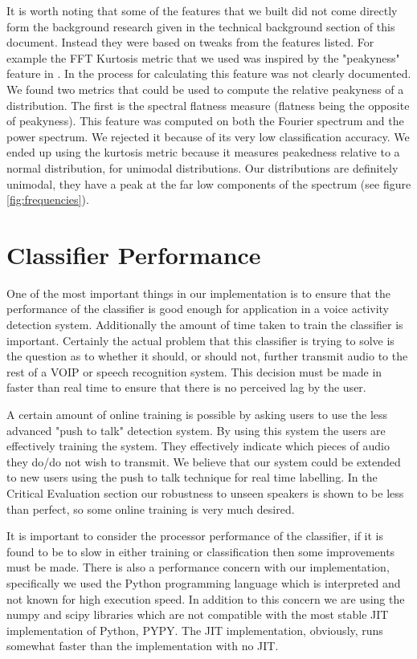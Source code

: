\documentclass[ %
                    author={Sam Phippen},
                supervisor={Dr. Rafal Bogacz},
                     title={Real time voice activity detectors in noisy personal computing environments},
                  subtitle={},
                    degree={MEng},
                      year={2012} ]{thesis}
\begin{document}
It is worth noting that some of the features that we built did not come
directly form the background research given in the technical background section
of this document. Instead they were based on tweaks from the features listed.
For example the FFT Kurtosis metric that we used was inspired by the
"peakyness" feature in \cite{shin}. In \cite{shin} the process for calculating
this feature was not clearly documented. We found two metrics that could be
used to compute the relative peakyness of a distribution. The first is the
spectral flatness measure (flatness being the opposite of peakyness). This
feature was computed on both the Fourier spectrum and the power spectrum. We
rejected it because of its very low classification accuracy. We ended up using
the kurtosis metric because it measures peakedness relative to a normal
distribution, for unimodal distributions\cite{DeCarlo}. Our distributions are
definitely unimodal, they have a peak at the far low components of the spectrum
(see figure \ref{fig:frequencies}).


\section{Classifier Performance}

One of the most important things in our implementation is to ensure that the
performance of the classifier is good enough for application in a voice activity
detection system. Additionally the amount of time taken to train the classifier
is important. Certainly the actual problem that this classifier is trying to
solve is the question as to whether it should, or should not, further transmit
audio to the rest of a VOIP or speech recognition system. This decision must be
made in faster than real time to ensure that there is no perceived lag by the
user.

A certain amount of online training is possible by asking users to use the less
advanced "push to talk" detection system. By using this system the users are
effectively training the system. They effectively indicate which pieces of
audio they do/do not wish to transmit. We believe that our system could be
extended to new users using the push to talk technique for real time labelling.
In the Critical Evaluation section our robustness to unseen speakers is shown
to be less than perfect, so some online training is very much desired.

It is important to consider the processor performance of the classifier, if it
is found to be to slow in either training or classification then some
improvements must be made. There is also a performance concern with our
implementation, specifically we used the Python\cite{python} programming
language which is interpreted and not known for high execution speed. In
addition to this concern we are using the numpy and scipy libraries which are
not compatible with the most stable JIT implementation of Python,
PYPY\cite{pypy}. The JIT implementation, obviously, runs somewhat faster than
the implementation with no JIT.
\end{document}

